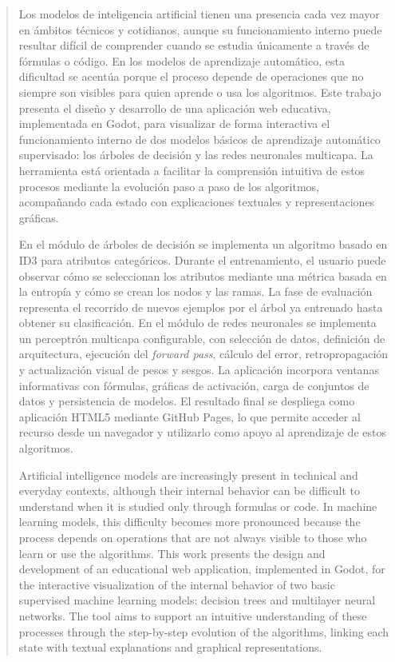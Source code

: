 
\pagestyle{empty}
\begin{abstract}
  Los modelos de inteligencia artificial tienen una presencia cada vez mayor en ámbitos técnicos y cotidianos, aunque su funcionamiento interno puede resultar difícil de comprender cuando se estudia únicamente a través de fórmulas o código.
  En los modelos de aprendizaje automático, esta dificultad se acentúa porque el proceso depende de operaciones que no siempre son visibles para quien aprende o usa los algoritmos.
  Este trabajo presenta el diseño y desarrollo de una aplicación web educativa, implementada en Godot, para visualizar de forma interactiva el funcionamiento interno de dos modelos básicos de aprendizaje automático supervisado: los árboles de decisión y las redes neuronales multicapa.
  La herramienta está orientada a facilitar la comprensión intuitiva de estos procesos mediante la evolución paso a paso de los algoritmos, acompañando cada estado con explicaciones textuales y representaciones gráficas.

  En el módulo de árboles de decisión se implementa un algoritmo basado en ID3 para atributos categóricos.
  Durante el entrenamiento, el usuario puede observar cómo se seleccionan los atributos mediante una métrica basada en la entropía y cómo se crean los nodos y las ramas.
  La fase de evaluación representa el recorrido de nuevos ejemplos por el árbol ya entrenado hasta obtener su clasificación.
  En el módulo de redes neuronales se implementa un perceptrón multicapa configurable, con selección de datos, definición de arquitectura, ejecución del \textit{forward pass}, cálculo del error, retropropagación y actualización visual de pesos y sesgos.
  La aplicación incorpora ventanas informativas con fórmulas, gráficas de activación, carga de conjuntos de datos y persistencia de modelos.
  El resultado final se despliega como aplicación HTML5 mediante GitHub Pages, lo que permite acceder al recurso desde un navegador y utilizarlo como apoyo al aprendizaje de estos algoritmos.

  \vspace*{25pt}
  \begin{segundoresumo}
    Artificial intelligence models are increasingly present in technical and everyday contexts, although their internal behavior can be difficult to understand when it is studied only through formulas or code.
    In machine learning models, this difficulty becomes more pronounced because the process depends on operations that are not always visible to those who learn or use the algorithms.
    This work presents the design and development of an educational web application, implemented in Godot, for the interactive visualization of the internal behavior of two basic supervised machine learning models: decision trees and multilayer neural networks.
    The tool aims to support an intuitive understanding of these processes through the step-by-step evolution of the algorithms, linking each state with textual explanations and graphical representations.


\end{segundoresumo}
\end{abstract}

